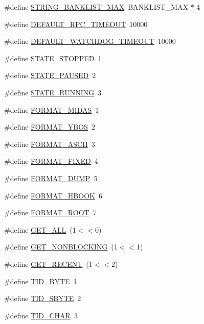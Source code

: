 \begin{DoxyCompactItemize}
\#define \hyperlink{group__midasincludecode_gafec0c8869c3f66ea7d186ec4b7682fc0}{STRING\_\-BANKLIST\_\-MAX}~BANKLIST\_\-MAX $\ast$ 4
\item 
\#define \hyperlink{group__midasincludecode_ga39d21da28bfcbf0caba6bd19ef551f36}{DEFAULT\_\-RPC\_\-TIMEOUT}~10000
\item 
\#define \hyperlink{group__midasincludecode_ga277afc8607c7a55aafffc11d69be143c}{DEFAULT\_\-WATCHDOG\_\-TIMEOUT}~10000
\item 
\#define \hyperlink{group__mdefineh_ga6a8dac64367bd381245f2eb09a7fe919}{STATE\_\-STOPPED}~1
\item 
\#define \hyperlink{group__mdefineh_gab08c47284371c683ba80d6b3244400f1}{STATE\_\-PAUSED}~2
\item 
\#define \hyperlink{group__mdefineh_gac4c0304c569818c811515e24523c3150}{STATE\_\-RUNNING}~3
\item 
\#define \hyperlink{group__mdefineh_gac7ef5b0cbb1fc1d26c3bfd4cc4a191a9}{FORMAT\_\-MIDAS}~1
\item 
\#define \hyperlink{group__mdefineh_gaab9657af955d54be6cd05e0a726ad964}{FORMAT\_\-YBOS}~2
\item 
\#define \hyperlink{group__mdefineh_gaf900017aedf1bdc7e50fcbf949464e6d}{FORMAT\_\-ASCII}~3
\item 
\#define \hyperlink{group__mdefineh_ga44835dd4c169e13e0fedf8c01a54dc2b}{FORMAT\_\-FIXED}~4
\item 
\#define \hyperlink{group__mdefineh_gaffaf04a985dfa6ff43ab39a8c6e3f0a7}{FORMAT\_\-DUMP}~5
\item 
\#define \hyperlink{group__mdefineh_gac3a857e4820ecdaa22f9a66a560dccad}{FORMAT\_\-HBOOK}~6
\item 
\#define \hyperlink{group__mdefineh_ga9663ae12f7cbf4295b3804ebd335e408}{FORMAT\_\-ROOT}~7
\item 
\#define \hyperlink{group__mdefineh_ga16218704fdf35f7624064c9d1d4bc78f}{GET\_\-ALL}~(1$<$$<$0)
\item 
\#define \hyperlink{group__mdefineh_ga0c91e56af17a9a23f5adab8a4099fac6}{GET\_\-NONBLOCKING}~(1$<$$<$1)
\item 
\#define \hyperlink{group__mdefineh_ga3275482a8a2223e4d57ac51d967979f8}{GET\_\-RECENT}~(1$<$$<$2)
\item 
\#define \hyperlink{group__mdefineh_ga7499d3aa0ca98d255f5147494ab4f572}{TID\_\-BYTE}~1
\item 
\#define \hyperlink{group__mdefineh_ga150e3437f490b1e7c0e11046a9ead174}{TID\_\-SBYTE}~2
\item 
\#define \hyperlink{group__mdefineh_gad4af77af5f2910e73596592030e37ab7}{TID\_\-CHAR}~3
$$
\end{DoxyCompactItemize}
